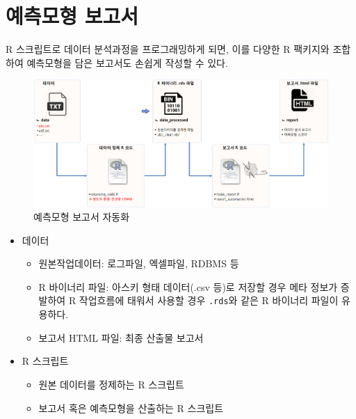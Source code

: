 \documentclass[
  letterpaper,
  chapter,a4paper,showtrims,openright,hidelinks]{oblivoir}
\providecommand{\tightlist}{%
  \setlength{\itemsep}{0pt}\setlength{\parskip}{0pt}}\usepackage{longtable,booktabs,array}
\begin{document}
\hypertarget{uxc608uxce21uxbaa8uxd615-uxbcf4uxace0uxc11c}{%
\section{예측모형
보고서}\label{uxc608uxce21uxbaa8uxd615-uxbcf4uxace0uxc11c}}

R 스크립트로 데이터 분석과정을 프로그래밍하게 되면, 이를 다양한 R
팩키지와 조합하여 예측모형을 담은 보고서도 손쉽게 작성할 수 있다.

\begin{figure}

{\centering \includegraphics{images/predictive_model_automation.png}

}

\caption{예측모형 보고서 자동화}

\end{figure}

\begin{itemize}
\tightlist
\item
  데이터

  \begin{itemize}
  \tightlist
  \item
    원본작업데이터: 로그파일, 엑셀파일, RDBMS 등
  \item
    R 바이너리 파일: 아스키 형태 데이터(.csv 등)로 저장할 경우 메타
    정보가 증발하여 R 작업흐름에 태워서 사용할 경우 \texttt{.rds}와 같은
    R 바이너리 파일이 유용하다.
  \item
    보고서 HTML 파일: 최종 산출물 보고서
  \end{itemize}
\item
  R 스크립트

  \begin{itemize}
  \tightlist
  \item
    원본 데이터를 정제하는 R 스크립트
  \item
    보고서 혹은 예측모형을 산출하는 R 스크립트
  \end{itemize}
\end{itemize}
\end{document}
